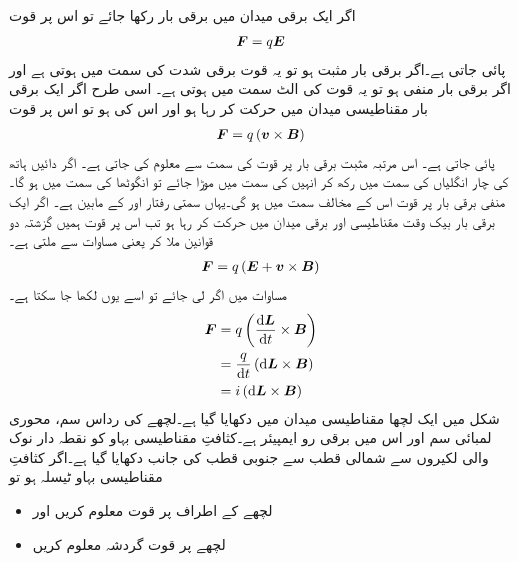 اگر ایک برقی میدان میں برقی بار  رکھا جائے تو اس پر قوت
\begin{align}
{\ensuremath{{\boldsymbol{F}}}}=q {{\boldsymbol{E}}}
\end{align}
پائی جاتی ہے۔اگر برقی بار مثبت ہو تو یہ قوت برقی شدت  کی سمت میں ہوتی ہے اور اگر برقی بار منفی ہو تو یہ قوت  کی الٹ سمت میں ہوتی ہے۔ اسی طرح اگر ایک برقی بار مقناطیسی میدان میں حرکت کر رہا ہو اور اس کی   ہو تو اس پر قوت
\begin{align}\label{مساوات_برقی_میکانی_تبادلہ_مقناطیسی}
{\ensuremath{{\boldsymbol{F}}}}=q \left({{\boldsymbol{v}}} \times {\ensuremath{{\boldsymbol{B}}}} \right)
\end{align}
پائی جاتی ہے۔ اس مرتبہ مثبت برقی بار پر قوت کی سمت  سے معلوم کی جاتی ہے۔ اگر دائیں ہاتھ کی چار انگلیاں  کی سمت میں رکھ کر انہیں  کی سمت میں موڑا جائے تو انگوٹھا  کی سمت میں ہو گا۔ منفی برقی بار پر قوت اس کے مخالف سمت میں ہو گی۔یہاں سمتی رفتار  اور  کے مابین ہے۔ اگر ایک برقی بار بیک وقت مقناطیسی اور برقی میدان میں حرکت کر رہا ہو تب اس پر قوت ہمیں گزشتہ دو قوانین ملا کر یعنی مساوات   سے ملتی ہے۔
\begin{align}
{\ensuremath{{\boldsymbol{F}}}}=q \left({{\boldsymbol{E}}}+{{\boldsymbol{v}}} \times {\ensuremath{{\boldsymbol{B}}}}  \right)
\end{align}
مساوات   میں اگر  لی جائے تو اسے یوں لکھا جا سکتا ہے۔
\begin{gather}
\begin{aligned}
\kvec{F}&=q \left(\frac{\dif \kvec{L}}{\dif t} \times \kvec{B} \right)\\
&=\frac{q}{\dif t} \left(\dif \kvec{L} \times \kvec{B} \right)\\
&=i \left(\dif \kvec{L} \times \kvec{B}  \right)
\end{aligned}
\end{gather}
%
شکل  میں ایک لچھا مقناطیسی میدان میں دکھایا گیا ہے۔لچھے کی رداس  سم، محوری لمبائی  سم اور اس میں برقی رو   ایمپیئر ہے۔کثافتِ مقناطیسی بہاو کو نقطہ دار نوک والی لکیروں سے شمالی قطب سے جنوبی قطب کی جانب دکھایا گیا ہے۔اگر کثافتِ مقناطیسی بہاو  ٹیسلہ ہو تو 
\begin{itemize}
\item
لچھے کے اطراف پر قوت معلوم کریں اور
\item
لچھے پر قوت گردشہ  معلوم کریں
\end{itemize}
